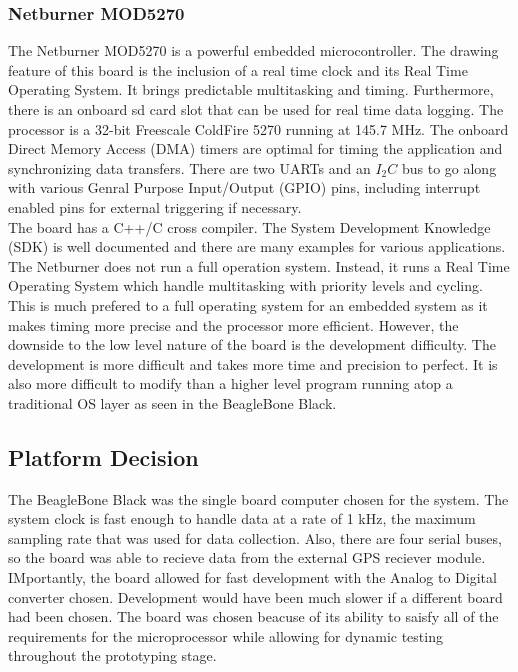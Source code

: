 \subsubsection{Netburner MOD5270}
\label{subsec:MOD5270}
\indent The Netburner MOD5270 is a powerful embedded microcontroller. The drawing feature of this board is the inclusion of a real time clock and its Real Time Operating System. It brings predictable multitasking and timing. Furthermore, there is an onboard sd card slot that can be used for real time data logging. The processor is a 32-bit Freescale ColdFire 5270 running at 145.7 MHz. The onboard Direct Memory Access (DMA) timers are optimal for timing the application and synchronizing data transfers. There are two UARTs and an $I_2C$ bus to go along with various Genral Purpose Input/Output (GPIO) pins, including interrupt enabled pins for external triggering if necessary. \\
\indent The board has a C++/C cross compiler. The System Development Knowledge (SDK) is well documented and there are many examples for various applications. The Netburner does not run a full operation system. Instead, it runs a Real Time Operating System which handle multitasking with priority levels and cycling. This is much prefered to a full operating system for an embedded system as it makes timing more precise and the processor more efficient. However, the downside to the low level nature of the board is the development difficulty. The development is more difficult and takes more time and precision to perfect. It is also more difficult to modify than a higher level program running atop a traditional OS layer as seen in the BeagleBone Black.

\subsection{Platform Decision}

The BeagleBone Black was the single board computer chosen for the system. The system clock is fast enough to handle data at a rate of 1 kHz, the maximum sampling rate that was used for data collection. Also, there are four serial buses, so the board was able to recieve data from the external GPS reciever module. IMportantly, the board allowed for fast development with the Analog to Digital converter chosen. Development would have been much slower if a different board had been chosen. The board was chosen beacuse of its ability to saisfy all of the requirements for the microprocessor while allowing for dynamic testing throughout the prototyping stage. 
